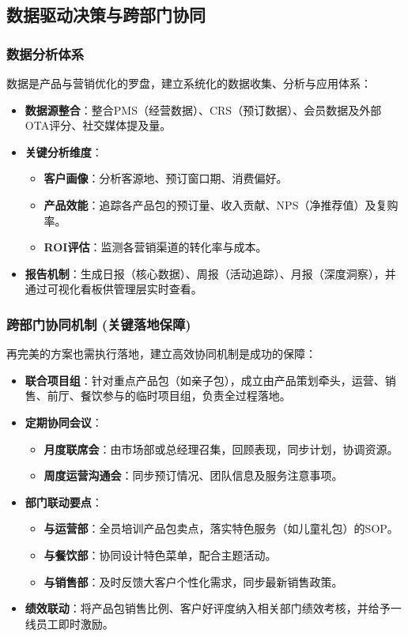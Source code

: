 \documentclass{cumcmthesis}
\begin{document}
\subsection{数据驱动决策与跨部门协同}
\subsubsection{数据分析体系}
数据是产品与营销优化的罗盘，建立系统化的数据收集、分析与应用体系：
\begin{itemize}
    \item \textbf{数据源整合}：整合PMS（经营数据）、CRS（预订数据）、会员数据及外部OTA评分、社交媒体提及量。
    \item \textbf{关键分析维度}：
    \begin{itemize}
        \item \textbf{客户画像}：分析客源地、预订窗口期、消费偏好。
        \item \textbf{产品效能}：追踪各产品包的预订量、收入贡献、NPS（净推荐值）及复购率。
        \item \textbf{ROI评估}：监测各营销渠道的转化率与成本。
    \end{itemize}
    \item \textbf{报告机制}：生成日报（核心数据）、周报（活动追踪）、月报（深度洞察），并通过可视化看板供管理层实时查看。
\end{itemize}

\subsubsection{跨部门协同机制 (关键落地保障)}
再完美的方案也需执行落地，建立高效协同机制是成功的保障：
\begin{itemize}
    \item \textbf{联合项目组}：针对重点产品包（如亲子包），成立由产品策划牵头，运营、销售、前厅、餐饮参与的临时项目组，负责全过程落地。
    \item \textbf{定期协同会议}：
    \begin{itemize}
        \item \textbf{月度联席会}：由市场部或总经理召集，回顾表现，同步计划，协调资源。
        \item \textbf{周度运营沟通会}：同步预订情况、团队信息及服务注意事项。
    \end{itemize}
    \item \textbf{部门联动要点}：
    \begin{itemize}
        \item \textbf{与运营部}：全员培训产品包卖点，落实特色服务（如儿童礼包）的SOP。
        \item \textbf{与餐饮部}：协同设计特色菜单，配合主题活动。
        \item \textbf{与销售部}：及时反馈大客户个性化需求，同步最新销售政策。
    \end{itemize}
    \item \textbf{绩效联动}：将产品包销售比例、客户好评度纳入相关部门绩效考核，并给予一线员工即时激励。
\end{itemize}
\end{document}
